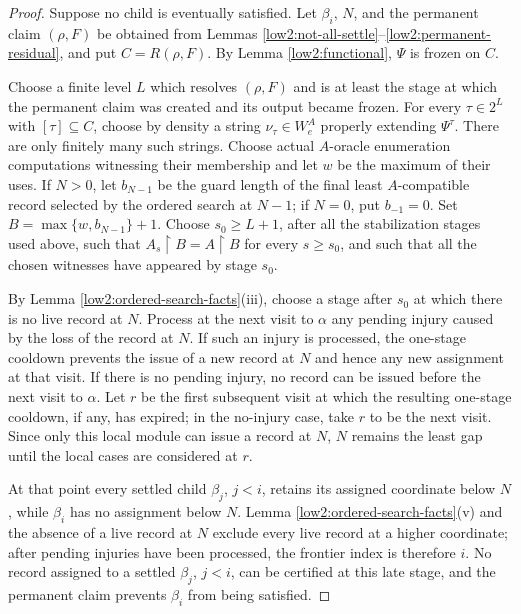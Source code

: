 \documentclass[10pt,a4paper]{amsart}
\begin{document}
\begin{proof}
Suppose no child is eventually satisfied. Let $\beta_i$, $N$, and the
permanent claim $(\rho,F)$ be obtained from Lemmas
\ref{low2:not-all-settle}--\ref{low2:permanent-residual}, and put
$C=R(\rho,F)$. By Lemma \ref{low2:functional}, $\Psi$ is frozen on $C$.

Choose a finite level $L$ which resolves $(\rho,F)$ and is at least the stage
at which the permanent claim was created and its output became frozen. For every
$\tau\in2^L$ with $[\tau]\subseteq C$, choose by density a string $\nu_\tau\in W_e^A$ properly extending $\Psi^\tau$.
There are only finitely many such strings. Choose actual $A$-oracle
enumeration computations witnessing their membership and let $w$ be the
maximum of their uses. If $N>0$, let $b_{N-1}$ be the guard length of the
final least $A$-compatible record selected by the ordered search at $N-1$;
if $N=0$, put $b_{-1}=0$. Set $B=\max\{w,b_{N-1}\}+1$.
Choose $s_0\geq L+1$, after all the stabilization stages used above, such
that $A_s\upharpoonright B=A\upharpoonright B$ for every $s\geq s_0$,
and such that all the chosen witnesses have appeared by stage $s_0$.

By Lemma \ref{low2:ordered-search-facts}(iii), choose a stage after $s_0$ at
which there is no live record at $N$. Process at the next visit to $\alpha$ any
pending injury caused by the loss of the record at $N$. If such an injury is
processed, the one-stage cooldown prevents the issue of a new record at $N$
and hence any new assignment at that visit. If there is no pending injury, no
record can be issued before the next visit to $\alpha$. Let $r$ be the first
subsequent visit at which the resulting one-stage cooldown, if any, has
expired; in the no-injury case, take $r$ to be the next visit. Since only this
local module can issue a record at $N$, $N$ remains the least gap until the
local cases are considered at $r$.

At that point every settled child $\beta_j$, $j<i$, retains its assigned
coordinate below $N$, while $\beta_i$ has no assignment below $N$. Lemma
\ref{low2:ordered-search-facts}(v) and the absence of a live record at $N$
exclude every live record at a higher coordinate; after pending injuries have been
processed, the frontier index is therefore $i$. No record assigned to a
settled $\beta_j$, $j<i$, can be certified at this late stage, and the
permanent claim prevents $\beta_i$ from being satisfied.


\end{proof}
\end{document}
